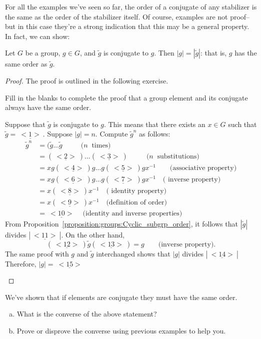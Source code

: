 For all the examples we've seen so far, the order of a conjugate of any stabilizer is the same as the order of the stabilizer itself. Of course, examples are not proof--but in this case they're a strong indication that this may be a general property. In fact, we can show: 

\begin{prop} Let $G$ be a group, $g \in G$, and $\tilde{g}$ is conjugate to $g$. Then $|g| = |\tilde{g}|$: that is,  $g$ has the same order as $\tilde{g}$.
\end{prop}

\begin{proof}  The proof is outlined in the following exercise.

\begin{exercise}\label{exercise:actions:Conj15b}
Fill in the blanks to complete the proof that a group element and its conjugate always have the same order.

Suppose that $\tilde{g}$ is conjugate to $g$. This means that there exists an $x\in G$ such that $\tilde{g}=\underline{~<1>~}$. Suppose $|g|=n$. Compute $\tilde{g}^n$ as follows:
\begin{align*}
 \tilde{g}^n&=(\tilde{g} \ldots \tilde{g}~~~~~~~~~~~~(n~\text{ times)}\\ 
&=(\underline{~<2>~}) \ldots (\underline{~<3>~})~~~~~~~~~~~~(n~\text{ substitutions)}\\ 
& =xg(\underline{~<4>~})g \ldots g(\underline{~<5>~})gx^{-1}\qquad\text{(associative property)}\\
&=xg(\underline{~<6>~})g...g(\underline{~<7>~})gx^{-1}\quad\text{( inverse property)}\\
&=x(\underline{~<8>~})x^{-1}\quad\text{( identity property)}\\
&=x(\underline{~<9>~})x^{-1}\quad\text{(definition of order)}\\
&=\underline{~<10>~}\quad\text{(identity and inverse properties)}
\end{align*}
\noindent
From Proposition~\ref{proposition:groups:Cyclic_subgrp_order}, it follows that  $| \tilde{g}|$ divides $|\underline{~<11>~}|$. On the other hand, \[(\underline{~<12>~})\tilde{g}(\underline{~<13>~})=g\qquad\text{(inverse property)}.\]  
The same proof  with $g$ and $\tilde{g}$ interchanged shows that $|g|$ divides $|\underline{~<14>~}|$ Therefore,  $|g|=\underline{~<15>~}$ 
\end{exercise}
\end{proof}

\begin{exercise}\label{exercise:actions:Conj15c}
We've shown that if elements are conjugate they must have the same order.
\begin{enumerate}[(a)]
\item What is the converse of the above statement?
\item Prove or disprove the converse using previous examples to help you.
\end{enumerate}
\end{exercise}
 
